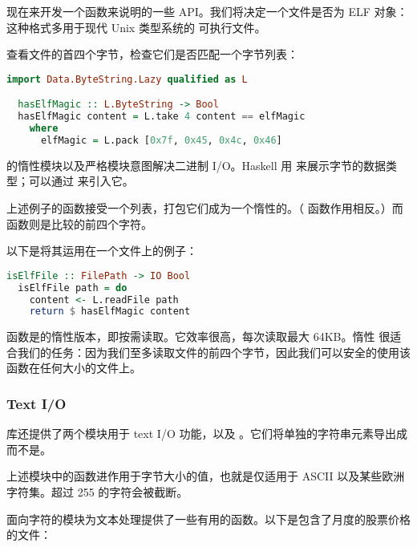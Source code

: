 \documentclass[./main.tex]{subfiles}
\begin{document}
现在来开发一个函数来说明的一些 API。我们将决定一个文件是否为 ELF 对象：这种格式多用于现代 Unix 类型系统的
可执行文件。

查看文件的首四个字节，检查它们是否匹配一个字节列表：

\begin{lstlisting}[language=Haskell]
  import Data.ByteString.Lazy qualified as L

  hasElfMagic :: L.ByteString -> Bool
  hasElfMagic content = L.take 4 content == elfMagic
    where
      elfMagic = L.pack [0x7f, 0x45, 0x4c, 0x46]
\end{lstlisting}

的惰性模块以及严格模块意图解决二进制 I/O。Haskell 用  来展示字节的数据类型；可以通过
来引入它。

上述例子的函数接受一个列表，打包它们成为一个惰性的。（
函数作用相反。）而函数则是比较的前四个字符。

以下是将其运用在一个文件上的例子：

\begin{lstlisting}[language=Haskell]
  isElfFile :: FilePath -> IO Bool
  isElfFile path = do
    content <- L.readFile path
    return $ hasElfMagic content
\end{lstlisting}

函数是的惰性版本，即按需读取。它效率很高，每次读取最大 64KB。惰性
很适合我们的任务：因为我们至多读取文件的前四个字节，因此我们可以安全的使用该函数在任何大小的文件上。

\subsubsection*{Text I/O}

库还提供了两个模块用于 text I/O 功能，以及
。它们将单独的字符串元素导出成而不是。

\begin{awarn}
  上述模块中的函数进作用于字节大小的值，也就是仅适用于 ASCII 以及某些欧洲字符集。超过 255 的字符会被截断。
\end{awarn}

面向字符的模块为文本处理提供了一些有用的函数。以下是包含了月度的股票价格的文件：
\end{document}
